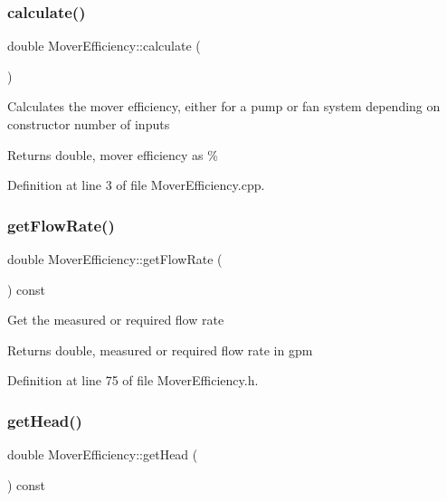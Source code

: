 \subsubsection{\texorpdfstring{calculate()}{calculate()}}
{\footnotesize\ttfamily double Mover\+Efficiency\+::calculate (\begin{DoxyParamCaption}{ }\end{DoxyParamCaption})}

Calculates the mover efficiency, either for a pump or fan system depending on constructor number of inputs \begin{DoxyReturn}{Returns}
double, mover efficiency as \% 
\end{DoxyReturn}


Definition at line 3 of file Mover\+Efficiency.\+cpp.

\mbox{\label{class_mover_efficiency_a3b0d468a68703127624ab996f03d2368}} 
\subsubsection{\texorpdfstring{get\+Flow\+Rate()}{getFlowRate()}}
{\footnotesize\ttfamily double Mover\+Efficiency\+::get\+Flow\+Rate (\begin{DoxyParamCaption}{ }\end{DoxyParamCaption}) const\hspace{0.3cm}{\ttfamily [inline]}}

Get the measured or required flow rate \begin{DoxyReturn}{Returns}
double, measured or required flow rate in gpm 
\end{DoxyReturn}


Definition at line 75 of file Mover\+Efficiency.\+h.

\mbox{\label{class_mover_efficiency_a9ce5f2dba38ae4f271bdb2c018667144}} 
\subsubsection{\texorpdfstring{get\+Head()}{getHead()}}
{\footnotesize\ttfamily double Mover\+Efficiency\+::get\+Head (\begin{DoxyParamCaption}{ }\end{DoxyParamCaption}) const\hspace{0.3cm}{\ttfamily [inline]}}

